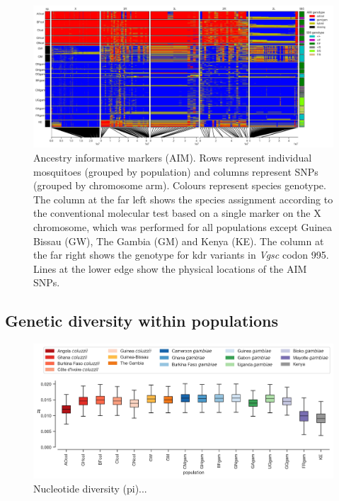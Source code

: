 \documentclass[a4paper,11pt,abstracton,hidelinks]{scrartcl}
\begin{document}
\begin{figure}[H]
	\begin{center}
		\includegraphics*[width=6.3in]{artwork/AIM_figure_scaled.jpg}
	\end{center}
	\caption{Ancestry informative markers (AIM). Rows represent individual mosquitoes (grouped by population) and columns represent SNPs (grouped by chromosome arm). Colours represent species genotype. The column at the far left shows the species assignment according to the conventional molecular test based on a single marker on the X chromosome, which was performed for all populations except Guinea Bissau (GW), The Gambia (GM) and Kenya (KE). The column at the far right shows the genotype for kdr variants in \textit{Vgsc} codon 995. Lines at the lower edge show the physical locations of the AIM SNPs.}
	\label{aim}
\end{figure}

\subsection*{Genetic diversity within populations}

\begin{figure}[H]
	\begin{center}
		\includegraphics*[width=6.3in]{artwork/pi.jpeg}
	\end{center}
	\caption{Nucleotide diversity (pi)...}
	\label{pi}
\end{figure}
\end{document}
